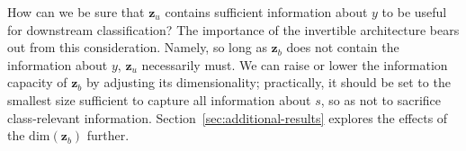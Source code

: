 How can we be sure that $\bm{z}_u$ contains sufficient information about $y$ to be useful for
downstream classification?
%
The importance of the invertible architecture bears out from this consideration. 
Namely, so long as $\bm{z}_b$ does not contain the information about $y$, $\bm{z}_u$ necessarily must.
%
We can raise or lower the information capacity of $\bm{z}_b$ by adjusting its dimensionality;
practically, it should be set to the smallest size sufficient to capture all information about $s$,
so as not to sacrifice class-relevant information. 
%
Section~\ref{sec:additional-results} explores the effects of the \( \mathrm{dim}(\bm{z}_b) \) further.


